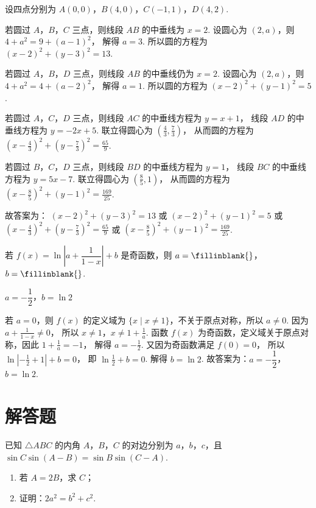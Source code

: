 \begin{solution}
设四点分别为 \(A(0,0)\)，\(B(4,0)\)，\(C(-1,1)\)，\(D(4,2)\).

若圆过 \(A\)，\(B\)，\(C\) 三点，则线段 \(AB\) 的中垂线为 \(x=2\). 设圆心为 \((2,a)\)，则
\(4+a^2=9+(a-1)^2\)，
解得
\(a=3\).
所以圆的方程为
\((x-2)^2+(y-3)^2=13\).

若圆过 \(A\)，\(B\)，\(D\) 三点，则线段 \(AB\) 的中垂线仍为 \(x=2\). 设圆心为 \((2,a)\)，则
\(4+a^2=4+(a-2)^2\)，
解得
\(a=1\).
所以圆的方程为
\((x-2)^2+(y-1)^2=5\).

若圆过 \(A\)，\(C\)，\(D\) 三点，则线段 \(AC\) 的中垂线方程为
\(y=x+1\)，
线段 \(AD\) 的中垂线方程为
\(y=-2x+5\).
联立得圆心为
\(\left(\frac43,\frac73\right)\)，
从而圆的方程为
\(\left(x-\frac43\right)^2+\left(y-\frac73\right)^2=\frac{65}{9}\).

若圆过 \(B\)，\(C\)，\(D\) 三点，则线段 \(BD\) 的中垂线方程为
\(y=1\)，
线段 \(BC\) 的中垂线方程为
\(y=5x-7\).
联立得圆心为
\(\left(\frac85,1\right)\)，
从而圆的方程为
\(\left(x-\frac85\right)^2+(y-1)^2=\frac{169}{25}\).

故答案为：
\((x-2)^2+(y-3)^2=13\)
或
\((x-2)^2+(y-1)^2=5\)
或
\(\left(x-\frac43\right)^2+\left(y-\frac73\right)^2=\frac{65}{9}\)
或
\(\left(x-\frac85\right)^2+(y-1)^2=\frac{169}{25}\).
\end{solution}

\begin{problem}
若 \(f(x)=\ln\left|a+\dfrac{1}{1-x}\right|+b\) 是奇函数，则 \(a=\fillinblank{}\)，\(b=\fillinblank{}\).
\end{problem}

\begin{answer}
\(a=-\dfrac12\)，\(b=\ln2\)
\end{answer}

\begin{solution}
若 \(a=0\)，则 \(f(x)\) 的定义域为 \(\{x\mid x\ne1\}\)，不关于原点对称，所以
\(a\ne0\).
因为
\(a+\frac{1}{1-x}\ne0\)，
所以
\(x\ne1\)，\(x\ne1+\frac1a\).
函数 \(f(x)\) 为奇函数，定义域关于原点对称，因此
\(1+\frac1a=-1\)，
解得
\(a=-\frac12\).
又因为奇函数满足
\(f(0)=0\)，
所以
\(\ln\left|-\frac12+1\right|+b=0\)，
即
\(\ln\frac12+b=0\).
解得
\(b=\ln2\).
故答案为：\(a=-\dfrac12\)，\(b=\ln2\).
\end{solution}
\section{解答题}

\begin{problem}
已知 \(\triangle ABC\) 的内角 \(A\)，\(B\)，\(C\) 的对边分别为 \(a\)，\(b\)，\(c\)，且 \(\sin C\sin\left(A-B\right)=\sin B\sin\left(C-A\right)\).

\begin{enumerate}
\item 若 \(A=2B\)，求 \(C\)；
\item 证明：\(2a^2=b^2+c^2\).
\end{enumerate}
\end{problem}

